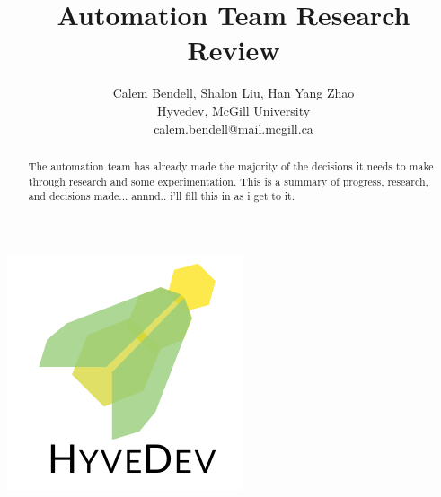 

\title{Automation Team Research Review}
\author{
\normalsize
{ Calem Bendell, Shalon Liu, Han Yang Zhao} \\
Hyvedev, McGill University \\
\href{mailto:calem.bendell@mail.mcgill.ca}{calem.bendell@mail.mcgill.ca}
}
\date{}


\maketitle

\begin{abstract}
The automation team has already made the majority of the decisions it needs to make through research and some experimentation.
This is a summary of progress, research, and decisions made...
annnd.. i'll fill this in as i get to it.
\end{abstract}

\begin{center}
	\includegraphics[width=.3\textwidth]{gfx/hyvedev-logo.pdf}
\end{center}

